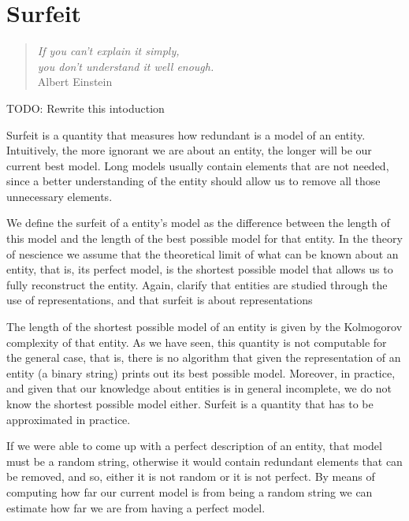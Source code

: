 %
%


\chapter{Surfeit}
\label{chap:Redundancy}

\begin{quote}
\begin{flushright}
\emph{If you can't explain it simply,\\
you don't understand it well enough.}\\
Albert Einstein 
\end{flushright}
\end{quote}
\bigskip

{\color{red} TODO: Rewrite this intoduction}

Surfeit is a quantity that measures how redundant is a model of an entity. Intuitively, the more ignorant we are about an entity, the longer will be our current best model. Long models usually contain elements that are not needed, since a better understanding of the entity should allow us to remove all those unnecessary elements. 

We define the surfeit of a entity's model as the difference between the length of this model and the length of the best possible model for that entity. In the theory of nescience we assume that the theoretical limit of what can be known about an entity, that is, its perfect model, is the shortest possible model that allows us to fully reconstruct the entity. {\color{red} Again, clarify that entities are studied through the use of representations, and that surfeit is about representations}

The length of the shortest possible model of an entity is given by the Kolmogorov complexity of that entity. As we have seen, this quantity is not computable for the general case, that is, there is no algorithm that given the representation of an entity (a binary string) prints out its best possible model. Moreover, in practice, and given that our knowledge about entities is in general incomplete, we do not know the shortest possible model either. Surfeit is a quantity that has to be approximated in practice.

If we were able to come up with a perfect description of an entity, that model must be a random string, otherwise it would contain redundant elements that can be removed, and so, either it is not random or it is not perfect. By means of computing how far our current model is from being a random string we can estimate how far we are from having a perfect model.

